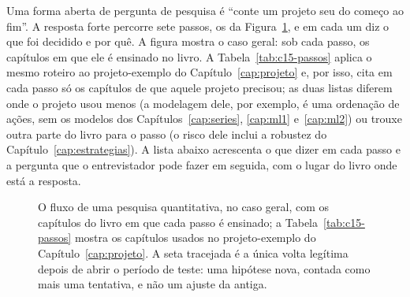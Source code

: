 Uma forma aberta de pergunta de pesquisa é ``conte um projeto seu do começo ao fim''. A resposta forte percorre sete passos, os da Figura~\ref{fig:c16-fluxo}, e em cada um diz o que foi decidido e por quê. A figura mostra o caso geral: sob cada passo, os capítulos em que ele é ensinado no livro. A Tabela~\ref{tab:c15-passos} aplica o mesmo roteiro ao projeto-exemplo do Capítulo~\ref{cap:projeto} e, por isso, cita em cada passo só os capítulos de que aquele projeto precisou; as duas listas diferem onde o projeto usou menos (a modelagem dele, por exemplo, é uma ordenação de ações, sem os modelos dos Capítulos~\ref{cap:series}, \ref{cap:ml1} e~\ref{cap:ml2}) ou trouxe outra parte do livro para o passo (o risco dele inclui a robustez do Capítulo~\ref{cap:estrategias}). A lista abaixo acrescenta o que dizer em cada passo e a pergunta que o entrevistador pode fazer em seguida, com o lugar do livro onde está a resposta.

\begin{figure}[t]
\begin{largo}
\centering
{}
\caption{O fluxo de uma pesquisa quantitativa, no caso geral, com os capítulos do livro em que cada passo é ensinado; a Tabela~\ref{tab:c15-passos} mostra os capítulos usados no projeto-exemplo do Capítulo~\ref{cap:projeto}. A seta tracejada é a única volta legítima depois de abrir o período de teste: uma hipótese nova, contada como mais uma tentativa, e não um ajuste da antiga.}
\label{fig:c16-fluxo}
\end{largo}
\end{figure}

